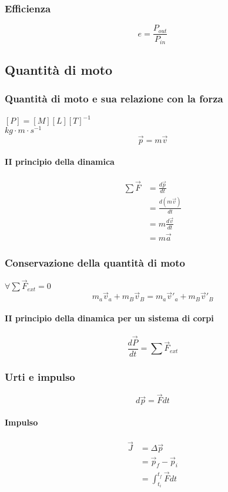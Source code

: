 \documentclass[a4paper,12pt]{article}
\theoremstyle{mystyle}
\begin{document}
\subsubsection{Efficienza}
\[e = \frac{P_{out}}{P_{in}}\]

\newpage


\subsection{Quantità di moto}
\subsubsection{Quantità di moto e sua relazione con la forza}
\([P]=[M][L][T]^{-1}\)\\
\(kg \cdot m \cdot s^{-1}\)\\
\[\vec p = m \vec v\]
\paragraph{II principio della dinamica}
\[
\begin{aligned}
    \sum \vec F &= \frac{d \vec p}{dt}\\
    &= \frac{d(m \vec v)}{dt}\\
    &= m \frac{d \vec v}{dt} \\
    &= m \vec a
\end{aligned}\]

\subsubsection{Conservazione della quantità di moto}
\(\forall \sum \vec F_{ext} = 0\)\\
\[m_a \vec v_a + m_B \vec v_B = m_a \vec v'_a + m_B \vec v'_B\]
\paragraph{II principio della dinamica per un sistema di corpi}
\[\frac{d \vec P}{dt} = \sum \vec F_{ext}\]
\subsubsection{Urti e impulso}
\[d \vec p = \vec F dt\]
\paragraph{Impulso}
\[
\begin{aligned}
    \vec J &= \Delta \vec p \\
    &= \vec p_f- \vec p_i \\
    &= \int_{t_i}^{t_f} \vec F dt
\end{aligned}\]
\end{document}
